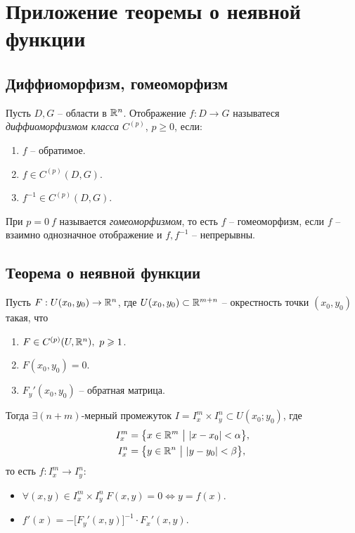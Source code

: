 \section{Приложение теоремы о неявной функции}

\setcounter{subsection}{16}

\subsection{Диффиоморфизм, гомеоморфизм}

\begin{definition}
    Пусть $ D,G $ -- области в $ \mathbb{R}^n $. Отображение $ f:D \rightarrow G $ называтеся \emph{диффиоморфизмом класса $ C^{(p)} $}, $ p \geqslant 0 $, если:
    \begin{enumerate}
        \item $ f $ -- обратимое.
        \item $ f \in C^{(p)}(D,G) $.
        \item $ f^{-1} \in C^{(p)}(D,G) $.
    \end{enumerate}

    При $ p=0 \ f $ называется \emph{гомеоморфизмом}, то есть $ f $ -- гомеоморфизм, если $ f $ -- взаимно однозначное отображение и $ f,f^{-1} $ -- непрерывны.
\end{definition}

\subsection{Теорема о неявной функции}

\begin{theorem}
    Пусть $ F:U(x_0,y_0) \rightarrow \mathbb{R}^n $, где $ U(x_0,y_0) \subset \mathbb{R}^{m+n} $ -- окрестность точки $ (x_0,y_0) $ такая, что
    \begin{enumerate}
        \item $ F\in C^{(p)}(U,\mathbb{R}^n), \ p \geqslant 1 $.
        \item $ F(x_0,y_0) = 0 $.
        \item $ F_y'(x_0,y_0) $ -- обратная матрица.
    \end{enumerate}

    Тогда $ \exists (n+m) $-мерный промежуток $ I = I_x^m \times I_y^n \subset U(x_0;y_0) $, где
    \begin{align*}
        I_x^m & = \big\{x\in \mathbb{R}^m \ \big| \ |x - x_0| < \alpha \big\}, \\
        I_x^n & = \big\{y\in \mathbb{R}^n \ \big| \ |y - y_0| < \beta \big\},
    \end{align*} то есть $ f:I_x^m \rightarrow I_y^n $:
    \begin{itemize}
        \item $ \forall (x,y) \in I_x^m \times I_y^n \ F(x,y) = 0 \iff y = f(x) $.
        \item $ f'(x) = -\big[F_y'(x,y)\big]^{-1} \cdot F_x'(x,y) $.
    \end{itemize}
\end{theorem}

